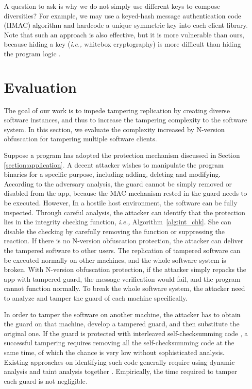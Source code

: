 \documentclass[10pt, conference]{IEEEtran}
\begin{document}
A question to ask is why we do not simply use different keys to compose diversities?  For example, we may use a keyed-hash message authentication code (HMAC) algorithm and hardcode a unique symmetric key into each client library.  Note that such an approach is also effective, but it is more vulnerable than ours, because hiding a key (\textit{i.e.,} whitebox cryptography) is more difficult than hiding the program logic \cite{chow2003white}.

\section{Evaluation} \label{section:evaluation}
The goal of our work is to impede tampering replication by creating diverse software instances, and thus to increase the tampering complexity to the software system.  In this section, we evaluate the complexity increased by N-version obfuscation for tampering multiple software clients.

Suppose a program has adopted the protection mechanism discussed in Section \ref{section:application}.  A decent attacker wishes to manipulate the program binaries for a specific purpose, including adding, deleting and modifying.  According to the adversary analysis,  the guard cannot be simply removed or disabled from the app, because the MAC mechanism rested in the guard needs to be executed.  However, In a hostile host environment, the software can be fully inspected.  Through careful analysis, the attacker can identify that the protection lies in the integrity checking function, \textit{i.e.,} Algorithm~\ref{alg:int_chk}.  She can disable the checking by carefully removing the function or suppressing the reaction.  If there is no N-version obfuscation protection, the attacker can deliver the tampered software to other users.  The replication of tampered software can be executed normally on other machines, and the whole software system is broken.  With N-version obfuscation protection, if the attacker simply repacks the app with tampered guard, the message verification would fail, and the program cannot function normally.  To break the whole software system, the attacker need to analyze and tamper the guard of each machine specifically.  

In order to tamper the software on another machine, the attacker has to obtain the guard on that machine, develop a tampered guard, and then substitute the original one.  If the guard is protected with interleaved self-checksumming code \cite{chang2002protecting}, a successful tampering requires removing all the self-checksumming code at the same time, of which the chance is very low without sophisticated analysis.  Existing approaches on identifying such code generally require using dynamic analysis and taint analysis together \cite{qiu2014framework}.  Empirically, the time required to tamper each guard is not negligible.
\end{document}
